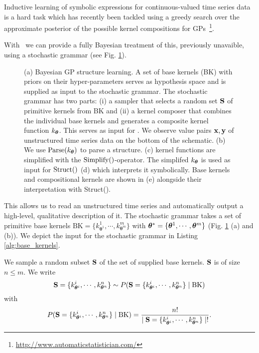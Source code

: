Inductive learning of symbolic expressions for continuous-valued time series
data is a hard task which has recently been tackled using a greedy search over 
the approximate posterior of the possible kernel compositions for
\ac{GP}s~\citep{duvenaud2013structure,lloyd2014automatic}\footnote{\url{http://www.automaticstatistician.com/}}.

With \gpmem\ we can provide a fully Bayesian treatment of this, previously unavaible,
using a stochastic grammar  (see Fig. \ref{fig:schema}).
\begin{figure}
\centering

\caption{\footnotesize (a) Bayesian GP structure learning. A set of
base kernels (BK) with priors on their hyper-parameters serves as hypothesis space
and is supplied as input to the stochastic grammar. The stochastic grammar has
two parts: (i) a sampler that selects a random set $\mathbf{S}$  of primitive kernels from BK
and (ii) a kernel composer that combines the individual base kernels and generates
a composite kernel function
$k_{\bm{\theta}}$. This serves as input for
\gpmem.  We observe value pairs $\mathbf{x},\mathbf{y}$ of unstructured time series data on
the bottom of the schematic.
(b) We use $\text{Parse}(k_{\bm{\theta}})$ to parse a structure. (c) kernel functions are
simplified with the $\text{Simplify}()$-operator. The simplifed $k_{\bm{\theta}}$ is used as input for
$\text{Struct}()$ (d) which  interprets it symbolically.
Base kernels and compositional kernels are shown in (e) alongside their
interpretation with Struct().}\label{fig:schema}
\end{figure}
This allows us to read an unstructured time series and automatically output a high-level,
qualitative description of it. The stochastic grammar takes a set of primitive base kernels 
    $\text{BK}=\{k_{\bm{\theta}^1}^1,\cdots,k_{\bm{\theta}^m}^m\}$ with
    $\bm{\theta}^*=\{\bm{\theta}^1,\cdots,\bm{\theta}^m\}$ (Fig. \ref{fig:schema} (a) and
(b)).
We depict the input for the
stochastic grammar in Listing \ref{alg:base_kernels}.

We sample a random subset $\mathbf{S}$ of
the set of supplied base kernels. $\mathbf{S}$ is of size $n \leq m$. We write
\[
\mathbf{S} = \{k_{\bm{\theta}^i}^i,\cdots,k_{\bm{\theta}^n}^n\}
\sim P(\mathbf{S} = \{k_{\bm{\theta}^i}^i,\cdots,k_{\bm{\theta}^n}^n\} \mid
\text{BK}) 
\]
with
\[
P(\mathbf{S} = \{k_{\bm{\theta}^i}^i,\cdots,k_{\bm{\theta}^n}^n\}\mid \text{BK}) =
\frac{n!}{ \mid \mathbf{S} = \{k_{\bm{\theta}^i}^i,\cdots,k_{\bm{\theta}^n}^n\}\mid !}.
\]

